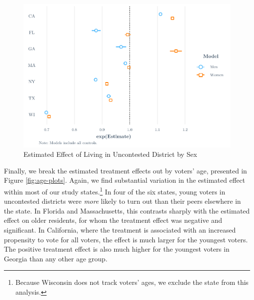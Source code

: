 \documentclass[
  12pt,
]{article}
\begin{document}
\begin{figure}[H]

{\centering \includegraphics{write_files/figure-latex/men-women-plots-1} 

}

\caption{\label{fig:men-women}Estimated Effect of Living in Uncontested District by Sex}\label{fig:men-women-plots}
\end{figure}

Finally, we break the estimated treatment effects out by voters' age, presented in Figure \ref{fig:age-plots}. Again, we find substantial variation in the estimated effect within most of our study states.\footnote{Because Wisconsin does not track voters' ages, we exclude the state from this analysis.} In four of the six states, young voters in uncontested districts were \emph{more} likely to turn out than their peers elsewhere in the state. In Florida and Massachusetts, this contrasts sharply with the estimated effect on older residents, for whom the treatment effect was negative and significant. In California, where the treatment is associated with an increased propensity to vote for all voters, the effect is much larger for the youngest voters. The positive treatment effect is also much higher for the youngest voters in Georgia than any other age group.
\end{document}
